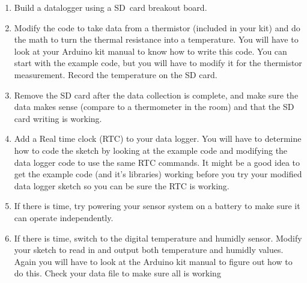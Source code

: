 \begin{enumerate}
\item Build a datalogger using a SD\ card breakout board.

\item Modify the code to take data from a thermistor (included in your kit)
and do the math to turn the thermal resistance into a temperature. You will
have to look at your Arduino kit manual to know how to write this code. You
can start with the example code, but you will have to modify it for the
thermistor measurement. Record the temperature on the SD card.

\item Remove the SD card after the data collection is complete, and make
sure the data makes sense (compare to a thermometer in the room) and that
the SD card writing is working.

\item Add a Real time clock (RTC) to your data logger. You will have to
determine how to code the sketch by looking at the example code and
modifying the data logger code to use the same RTC commands. It might be a
good idea to get the example code (and it's libraries) working before you
try your modified data logger sketch so you can be sure the RTC is working.

\item If there is time, try powering your sensor system on a battery to make
sure it can operate independently.

\item If there is time, switch to the digital temperature and humidly
sensor. Modify your sketch to read in and output both temperature and
humidly values. Again you will have to look at the Arduino kit manual to
figure out how to do this. Check your data file to make sure all is working
\end{enumerate}

\vfill%
